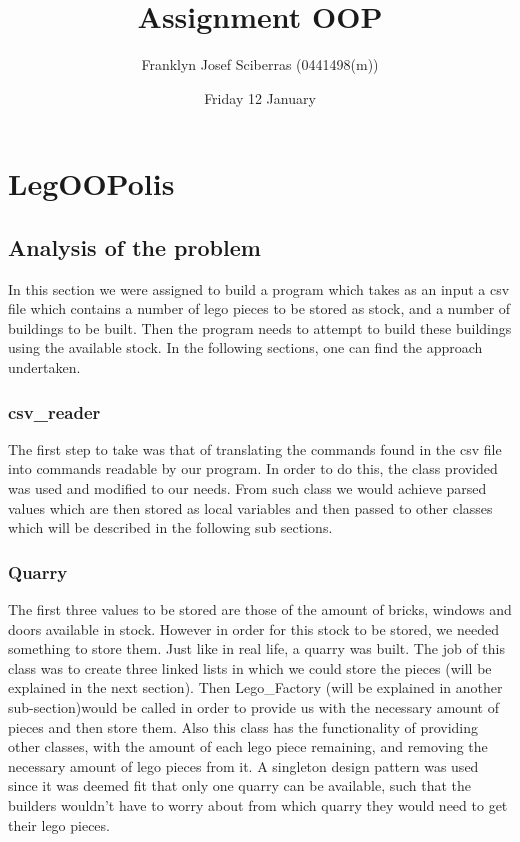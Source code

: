 \documentclass[12pt, A4]{report}
\title{Assignment OOP}
\author{Franklyn Josef Sciberras (0441498(m))}
\date{Friday 12 January}
\begin{document}
\begin{titlepage}
\maketitle
\end{titlepage}

\chapter*{LegOOPolis}
	\section*{Analysis of the problem}
	In this section we were assigned to build a program which takes as an input a csv file which contains a number of lego pieces to be stored as stock, and a number of buildings to be built. Then the program needs to attempt to build these buildings using the available stock. In the following sections, one can find the approach undertaken. 

		\subsection*{csv\_reader}
		The first step to take was that of translating the commands found in the csv file into commands readable by our program. In order to do this, the class provided was used and modified to our needs. From such class we would achieve parsed values which are then stored as local variables and then passed to other classes which will be described in the following sub sections.

		\subsection*{Quarry}
		The first three values to be stored are those of the amount of bricks, windows and doors available in stock. However in order for this stock to be stored, we needed something to store them. Just like in real life, a quarry was built. The job of this class was to create three linked lists in which we could store the pieces (will be explained in the next section). Then Lego\_Factory (will be explained in another sub-section)would be called in order to provide us with the necessary amount of pieces and then store them. Also this class has the functionality of providing other classes, with the amount of each lego piece remaining, and removing the necessary amount of lego pieces from it. A singleton design pattern was used since it was deemed fit that only one quarry can be available, such that the builders wouldn't have to worry about from which quarry they would need to get their lego pieces.
\end{document}
